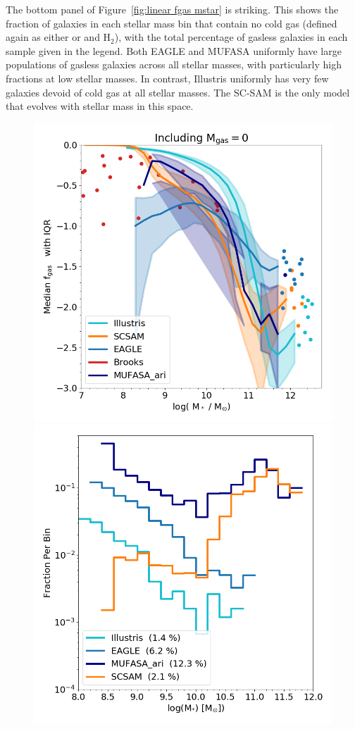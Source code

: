 \documentclass[fleqn,usenatbib]{mnras}
\begin{document}
The bottom panel of Figure~\ref{fig:linear fgas mstar} is striking. This shows the fraction of galaxies in each stellar mass bin that contain no cold gas (defined again as either  or  and H$_2$), with the total percentage of gasless galaxies in each sample given in the legend. Both EAGLE and MUFASA uniformly have large populations of gasless galaxies across all stellar masses, with particularly high fractions at low stellar masses. In contrast, Illustris uniformly has very few galaxies devoid of cold gas at all stellar masses. The SC-SAM is the only model that evolves with stellar mass in this space. 

\begin{figure}
\includegraphics[width = 0.99\linewidth]{fgas_mstar_binned_IQR_logged.png}\\
\includegraphics[width = 0.99\linewidth]{gasless_fraction_mstar.png}

\end{figure}
\end{document}
